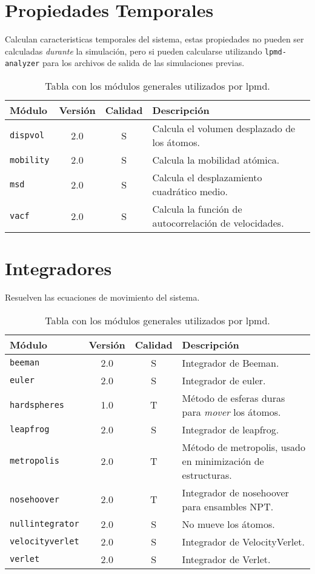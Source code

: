 \section{Propiedades Temporales}
Calculan caracteristicas temporales del sistema, estas propiedades no pueden ser calculadas \textit{durante} la simulaci\'on, pero si pueden calcularse utilizando \verb|lpmd-analyzer| para los archivos de salida de las simulaciones previas.

\begin{table}[h!]\centering
 \begin{tabular}{|l|c|c|p{10cm}|}\hline
 M\'odulo & Versi\'on & Calidad & Descripci\'on \\
 \hline
 \texttt{dispvol} & 2.0 & S & Calcula el volumen desplazado de los \'atomos.\\
 \hline
 \texttt{mobility} & 2.0 & S & Calcula la mobilidad at\'omica.\\
 \hline
 \texttt{msd} & 2.0 & S & Calcula el desplazamiento cuadr\'atico medio.\\
 \hline
 \texttt{vacf} & 2.0 & S & Calcula la funci\'on de autocorrelaci\'on de velocidades.\\
 \hline
 \end{tabular}
\label{tab:modtempproper}
\caption{Tabla con los m\'odulos generales utilizados por lpmd.}
\end{table}

\section{Integradores}
Resuelven las ecuaciones de movimiento del sistema.

\begin{table}[h!]\centering
 \begin{tabular}{|l|c|c|p{10cm}|}\hline
 M\'odulo & Versi\'on & Calidad & Descripci\'on \\
 \hline\hline
 \texttt{beeman} & 2.0 & S & Integrador de Beeman.\\
 \hline
 \texttt{euler} & 2.0 & S & Integrador de euler.\\
 \hline
 \texttt{hardspheres} & 1.0 & T & M\'etodo de esferas duras para \textit{mover} los \'atomos.\\
 \hline
 \texttt{leapfrog} & 2.0 & S & Integrador de leapfrog.\\
 \hline
 \texttt{metropolis} & 2.0 & T & M\'etodo de metropolis, usado en minimizaci\'on de estructuras.\\
 \hline
 \texttt{nosehoover} & 2.0 & T & Integrador de nosehoover para ensambles NPT.\\
 \hline
 \texttt{nullintegrator} & 2.0 & S & No mueve los \'atomos.\\
 \hline
 \texttt{velocityverlet} & 2.0 & S & Integrador de VelocityVerlet.\\
 \hline
 \texttt{verlet} & 2.0 & S & Integrador de Verlet.\\
 \hline
 \end{tabular}
\label{tab:modinteg}
\caption{Tabla con los m\'odulos generales utilizados por lpmd.}
\end{table}


